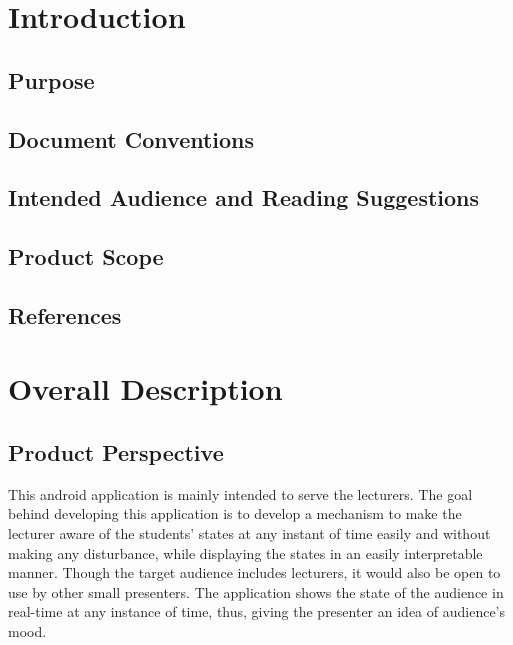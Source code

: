 \chapter{Introduction}
\label{ch:intro}
\section{Purpose}
\section{Document Conventions}
\section{Intended Audience and Reading Suggestions}
\section{Product Scope}
\section{References}


\chapter{Overall Description}
\label{Overall Description}

\section{Product Perspective}
This android application is mainly intended to serve the lecturers. The
goal behind developing this application is to develop a mechanism to make
the lecturer aware of the students' states at any instant of time easily
and without making any disturbance, while displaying the states in an
easily interpretable manner. Though the target audience includes lecturers,
it would also be open to use by other small presenters. The application
shows the state of the audience in real-time at any instance of time, thus,
giving the presenter an idea of audience's mood.

